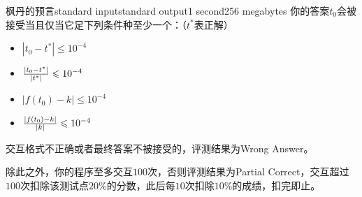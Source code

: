 \begin{problem}{枫丹的预言}{standard input}{standard output}{1 second}{256 megabytes}
你的答案$t_0$会被接受当且仅当它足下列条件种至少一个：（$t^*$表正解）
\begin{itemize}
\item $|t_0 - t^*| \le 10^{-4}$
\item ${|t_0 - t^*| \over |t^*|} \le 10^{-4}$
\item $|f(t_0) - k| \le 10^{-4}$
\item ${|f(t_0) - k| \over |k|} \le 10^{-4}$
\end{itemize}

交互格式不正确或者最终答案不被接受的，评测结果为Wrong Answer。

除此之外，你的程序至多交互$100$次，否则评测结果为Partial Correct，交互超过$100$次扣除该测试点$20\%$的分数，此后每$10$次扣除$10\%$的成绩，扣完即止。

\Example

\begin{example}
%
\end{example}

\end{problem}

